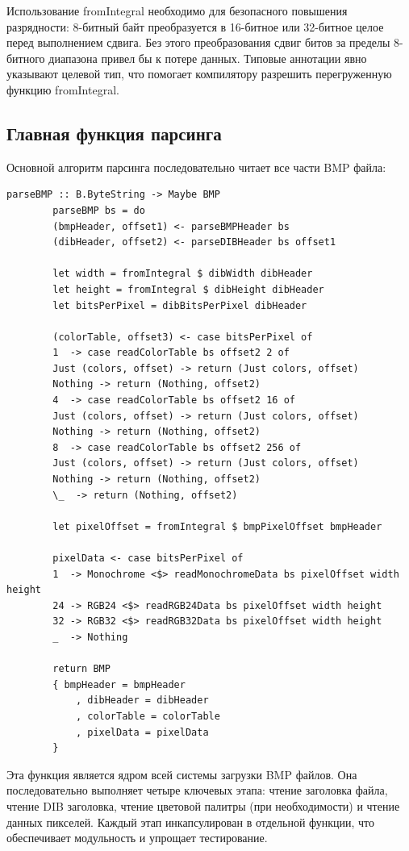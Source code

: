 \documentclass[a4paper,12pt]{article}
\begin{document}
	Использование fromIntegral необходимо для безопасного повышения разрядности: 8-битный байт преобразуется в 16-битное или 32-битное целое перед выполнением сдвига. Без этого преобразования сдвиг битов за пределы 8-битного диапазона привел бы к потере данных. Типовые аннотации явно указывают целевой тип, что помогает компилятору разрешить перегруженную функцию fromIntegral.
	
	\subsection{Главная функция парсинга}
	
	Основной алгоритм парсинга последовательно читает все части BMP файла:
	
	\begin{lstlisting}[caption=Основная функция парсинга BMP, label=lst:main-parser]
		parseBMP :: B.ByteString -> Maybe BMP
		parseBMP bs = do
		(bmpHeader, offset1) <- parseBMPHeader bs
		(dibHeader, offset2) <- parseDIBHeader bs offset1
		
		let width = fromIntegral $ dibWidth dibHeader
		let height = fromIntegral $ dibHeight dibHeader
		let bitsPerPixel = dibBitsPerPixel dibHeader
		
		(colorTable, offset3) <- case bitsPerPixel of
		1  -> case readColorTable bs offset2 2 of
		Just (colors, offset) -> return (Just colors, offset)
		Nothing -> return (Nothing, offset2)
		4  -> case readColorTable bs offset2 16 of
		Just (colors, offset) -> return (Just colors, offset)
		Nothing -> return (Nothing, offset2)
		8  -> case readColorTable bs offset2 256 of
		Just (colors, offset) -> return (Just colors, offset)
		Nothing -> return (Nothing, offset2)
		\_  -> return (Nothing, offset2)
		
		let pixelOffset = fromIntegral $ bmpPixelOffset bmpHeader
		
		pixelData <- case bitsPerPixel of
		1  -> Monochrome <$> readMonochromeData bs pixelOffset width height
		24 -> RGB24 <$> readRGB24Data bs pixelOffset width height
		32 -> RGB32 <$> readRGB32Data bs pixelOffset width height
		_  -> Nothing  
		
		return BMP
		{ bmpHeader = bmpHeader
			, dibHeader = dibHeader
			, colorTable = colorTable
			, pixelData = pixelData
		}
	\end{lstlisting}
	
	Эта функция является ядром всей системы загрузки BMP файлов. Она последовательно выполняет четыре ключевых этапа: чтение заголовка файла, чтение DIB заголовка, чтение цветовой палитры (при необходимости) и чтение данных пикселей. Каждый этап инкапсулирован в отдельной функции, что обеспечивает модульность и упрощает тестирование.
	
\end{document}
